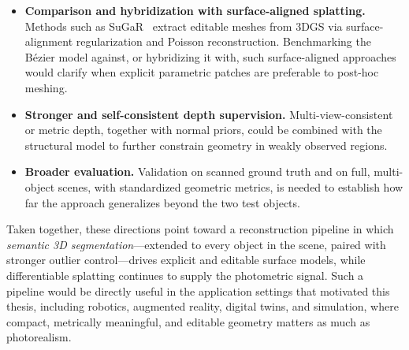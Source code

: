 \begin{itemize}
    \item \textbf{Comparison and hybridization with surface-aligned splatting.} Methods such as SuGaR~\cite{guedon2024sugar} extract editable meshes from 3DGS via surface-alignment regularization and Poisson reconstruction. Benchmarking the B\'ezier model against, or hybridizing it with, such surface-aligned approaches would clarify when explicit parametric patches are preferable to post-hoc meshing.
    \item \textbf{Stronger and self-consistent depth supervision.} Multi-view-consistent or metric depth, together with normal priors, could be combined with the structural model to further constrain geometry in weakly observed regions.
    \item \textbf{Broader evaluation.} Validation on scanned ground truth and on full, multi-object scenes, with standardized geometric metrics, is needed to establish how far the approach generalizes beyond the two test objects.
\end{itemize}

Taken together, these directions point toward a reconstruction pipeline in which \emph{semantic 3D segmentation}---extended to every object in the scene, paired with stronger outlier control---drives explicit and editable surface models, while differentiable splatting continues to supply the photometric signal. Such a pipeline would be directly useful in the application settings that motivated this thesis, including robotics, augmented reality, digital twins, and simulation, where compact, metrically meaningful, and editable geometry matters as much as photorealism.
